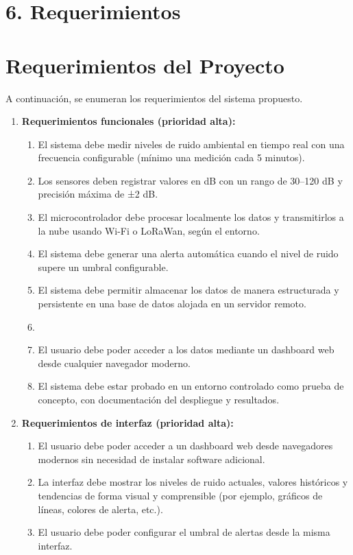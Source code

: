 \documentclass[
11pt, %
]{charter}
\begin{document}
\section{6. Requerimientos}
\label{sec:requerimientos}

\section{Requerimientos del Proyecto}

A continuación, se enumeran los requerimientos del sistema propuesto.

\begin{enumerate}
    \item \textbf{Requerimientos funcionales (prioridad alta):}
    \begin{enumerate}
        \item El sistema debe medir niveles de ruido ambiental en tiempo real con una frecuencia configurable (mínimo una medición cada 5 minutos).
        \item Los sensores deben registrar valores en dB con un rango de 30–120 dB y precisión máxima de ±2 dB.
        \item El microcontrolador debe procesar localmente los datos y transmitirlos a la nube usando Wi-Fi o LoRaWan, según el entorno.
        \item El sistema debe generar una alerta automática cuando el nivel de ruido supere un umbral configurable.
        \item El sistema debe permitir almacenar los datos de manera estructurada y persistente en una base de datos alojada en un servidor remoto.
        \item \item El usuario debe poder acceder a los datos mediante un dashboard web desde cualquier navegador moderno.
        \item El sistema debe estar probado en un entorno controlado como prueba de concepto, con documentación del despliegue y resultados.
    \end{enumerate}

    \item \textbf{Requerimientos de interfaz (prioridad alta):}
    \begin{enumerate}
        \item El usuario debe poder acceder a un dashboard web desde navegadores modernos sin necesidad de instalar software adicional.
        \item La interfaz debe mostrar los niveles de ruido actuales, valores históricos y tendencias de forma visual y comprensible (por ejemplo, gráficos de líneas, colores de alerta, etc.).
        \item El usuario debe poder configurar el umbral de alertas desde la misma interfaz.
    \end{enumerate}


\end{enumerate}
\end{document}
